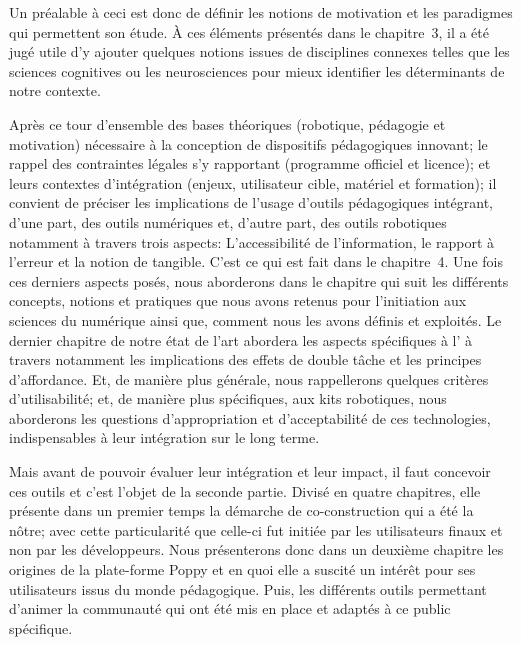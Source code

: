             Un préalable à ceci est donc de définir les notions de motivation et les paradigmes qui permettent son étude. À ces éléments présentés dans le chapitre~3, il a été jugé utile d'y ajouter quelques notions issues de disciplines connexes telles que les sciences cognitives ou les neurosciences pour mieux identifier les déterminants de notre contexte.\par%
            Après ce tour d'ensemble des bases théoriques (robotique, pédagogie et motivation) nécessaire à la conception de dispositifs pédagogiques innovant; le rappel des contraintes légales s'y rapportant (programme officiel et licence); et leurs contextes d'intégration (enjeux, utilisateur cible, matériel et formation); il convient de préciser les implications de l'usage d'outils pédagogiques intégrant, d'une part, des outils numériques et, d'autre part, des outils robotiques notamment à travers trois aspects: \Li L'accessibilité de l'information, \ii le rapport à l'erreur et \iii la notion de tangible. C'est ce qui est fait dans le chapitre~4.%
            Une fois ces derniers aspects posés, nous aborderons dans le chapitre qui suit les différents concepts, notions et pratiques que nous avons retenus pour l'initiation aux sciences du numérique ainsi que, 
            comment nous les avons définis et exploités.%
            Le dernier chapitre de notre état de l'art abordera les aspects spécifiques à l' à travers notamment les implications des effets de double tâche et les principes d'affordance.
            Et, de manière plus générale, nous rappellerons quelques critères d'utilisabilité; et, de manière plus spécifiques, aux kits robotiques, nous aborderons les questions d'appropriation et d'acceptabilité de ces technologies, indispensables à leur intégration sur le long terme.\par%
        Mais avant de pouvoir évaluer leur intégration et leur impact, il faut concevoir ces outils et c'est l'objet de la seconde partie.
            Divisé en quatre chapitres, elle présente dans un premier temps la démarche de co-construction qui a été la nôtre; avec cette particularité que celle-ci fut initiée par les utilisateurs finaux et non par les développeurs.
            Nous présenterons donc dans un deuxième chapitre les origines de la plate-forme Poppy et en quoi elle a suscité un intérêt pour ses utilisateurs issus du monde pédagogique.
            Puis, les différents outils permettant d'animer la communauté qui ont été mis en place et adaptés à ce public spécifique.
            
